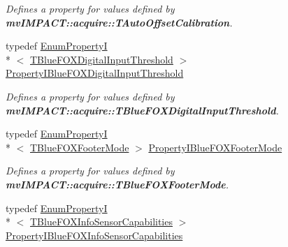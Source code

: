 \begin{DoxyCompactItemize}
\begin{DoxyCompactList}\small\item\em Defines a property for values defined by {\bfseries mv\+I\+M\+P\+A\+C\+T\+::acquire\+::\+T\+Auto\+Offset\+Calibration}. \end{DoxyCompactList}\item 
\hypertarget{group___device_specific_interface_gaa4592c9a62ecce3e3c51143034217bfd}{typedef \hyperlink{classmv_i_m_p_a_c_t_1_1acquire_1_1_enum_property_i}{Enum\+Property\+I}\\*
$<$ \hyperlink{group___device_specific_interface_gaea9362b2595ba187912465c014ddc069}{T\+Blue\+F\+O\+X\+Digital\+Input\+Threshold} $>$ \hyperlink{group___device_specific_interface_gaa4592c9a62ecce3e3c51143034217bfd}{Property\+I\+Blue\+F\+O\+X\+Digital\+Input\+Threshold}}\label{group___device_specific_interface_gaa4592c9a62ecce3e3c51143034217bfd}

\begin{DoxyCompactList}\small\item\em Defines a property for values defined by {\bfseries mv\+I\+M\+P\+A\+C\+T\+::acquire\+::\+T\+Blue\+F\+O\+X\+Digital\+Input\+Threshold}. \end{DoxyCompactList}\item 
\hypertarget{group___device_specific_interface_ga8c511231b6952821a370f845fea50d00}{typedef \hyperlink{classmv_i_m_p_a_c_t_1_1acquire_1_1_enum_property_i}{Enum\+Property\+I}\\*
$<$ \hyperlink{group___device_specific_interface_gab15f8e0830706ee1d2326d65a0635955}{T\+Blue\+F\+O\+X\+Footer\+Mode} $>$ \hyperlink{group___device_specific_interface_ga8c511231b6952821a370f845fea50d00}{Property\+I\+Blue\+F\+O\+X\+Footer\+Mode}}\label{group___device_specific_interface_ga8c511231b6952821a370f845fea50d00}

\begin{DoxyCompactList}\small\item\em Defines a property for values defined by {\bfseries mv\+I\+M\+P\+A\+C\+T\+::acquire\+::\+T\+Blue\+F\+O\+X\+Footer\+Mode}. \end{DoxyCompactList}\item 
\hypertarget{group___device_specific_interface_gafffac026d1345f9026199ff9e237f8ad}{typedef \hyperlink{classmv_i_m_p_a_c_t_1_1acquire_1_1_enum_property_i}{Enum\+Property\+I}\\*
$<$ \hyperlink{group___device_specific_interface_gadf8f04a2e8000f1b631efc902071b4fc}{T\+Blue\+F\+O\+X\+Info\+Sensor\+Capabilities} $>$ \hyperlink{group___device_specific_interface_gafffac026d1345f9026199ff9e237f8ad}{Property\+I\+Blue\+F\+O\+X\+Info\+Sensor\+Capabilities}}\label{group___device_specific_interface_gafffac026d1345f9026199ff9e237f8ad}


\end{DoxyCompactItemize}
